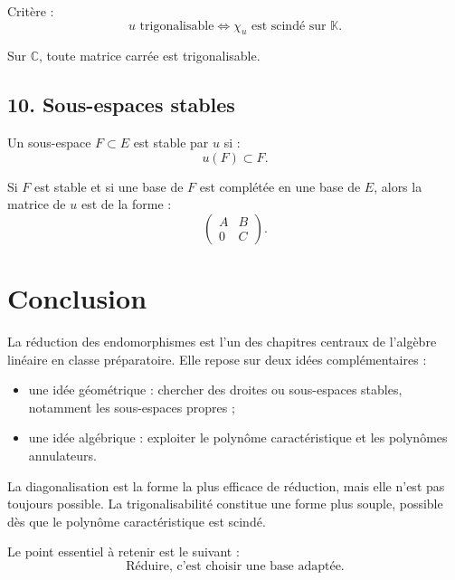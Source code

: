 \documentclass[11pt,a4paper]{article}
\newcommand{\K}{\mathbb K}
\newcommand{\C}{\mathbb C}
\begin{document}
Critère :
\[
u\text{ trigonalisable}
\Longleftrightarrow
\chi_u\text{ est scindé sur }\K.
\]

Sur \(\C\), toute matrice carrée est trigonalisable.

\subsection*{10. Sous-espaces stables}

Un sous-espace \(F\subset E\) est stable par \(u\) si :
\[
u(F)\subset F.
\]

Si \(F\) est stable et si une base de \(F\) est complétée en une base de \(E\), alors la matrice de \(u\) est de la forme :
\[
\begin{pmatrix}
A&B\\
0&C
\end{pmatrix}.
\]

\section*{Conclusion}

La réduction des endomorphismes est l'un des chapitres centraux de l'algèbre linéaire en classe préparatoire.  
Elle repose sur deux idées complémentaires :

\begin{itemize}
    \item une idée géométrique : chercher des droites ou sous-espaces stables, notamment les sous-espaces propres ;
    \item une idée algébrique : exploiter le polynôme caractéristique et les polynômes annulateurs.
\end{itemize}

La diagonalisation est la forme la plus efficace de réduction, mais elle n'est pas toujours possible.  
La trigonalisabilité constitue une forme plus souple, possible dès que le polynôme caractéristique est scindé.

Le point essentiel à retenir est le suivant :
\[
\text{Réduire, c'est choisir une base adaptée.}
\]
\end{document}
